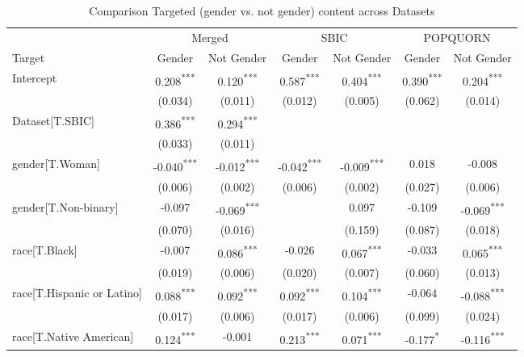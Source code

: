 \begin{table}[h!]
\caption{Comparison Targeted (gender vs. not gender) content across Datasets}
\label{}
\begin{center}
\begin{tabular}{lcccccc}
\hline

 & \multicolumn{2}{c}{Merged} & \multicolumn{2}{c}{SBIC} & \multicolumn{2}{c}{POPQUORN} \\
Target & Gender & Not Gender & Gender & Not Gender & Gender & Not Gender \\
\hline
Intercept & 0.208\textsuperscript{***} & 0.120\textsuperscript{***} & 0.587\textsuperscript{***} & 0.404\textsuperscript{***} & 0.390\textsuperscript{***} & 0.204\textsuperscript{***} \\
 & (0.034) & (0.011) & (0.012) & (0.005) & (0.062) & (0.014) \\
Dataset[T.SBIC] & \cellcolor{green!25}0.386\textsuperscript{***} & \cellcolor{green!25}0.294\textsuperscript{***} & & & & \\
 & (0.033) & (0.011) & & & & \\
gender[T.Woman] & \cellcolor{red!25}-0.040\textsuperscript{***} & \cellcolor{red!25}-0.012\textsuperscript{***} & \cellcolor{red!25}-0.042\textsuperscript{***} & \cellcolor{red!25}-0.009\textsuperscript{***} & 0.018 & -0.008 \\
 & (0.006) & (0.002) & (0.006) & (0.002) & (0.027) & (0.006) \\
gender[T.Non-binary] & -0.097 & \cellcolor{red!25}-0.069\textsuperscript{***} & & 0.097 & -0.109 & \cellcolor{red!25}-0.069\textsuperscript{***} \\
 & (0.070) & (0.016) & & (0.159) & (0.087) & (0.018) \\
race[T.Black] & -0.007 & \cellcolor{green!25}0.086\textsuperscript{***} & -0.026 & \cellcolor{green!25}0.067\textsuperscript{***} & -0.033 & \cellcolor{green!25}0.065\textsuperscript{***} \\
 & (0.019) & (0.006) & (0.020) & (0.007) & (0.060) & (0.013) \\
race[T.Hispanic or Latino] & \cellcolor{green!25}0.088\textsuperscript{***} & \cellcolor{green!25}0.092\textsuperscript{***} & \cellcolor{green!25}0.092\textsuperscript{***} & \cellcolor{green!25}0.104\textsuperscript{***} & -0.064 & \cellcolor{red!25}-0.088\textsuperscript{***} \\
 & (0.017) & (0.006) & (0.017) & (0.006) & (0.099) & (0.024) \\
race[T.Native American] & \cellcolor{green!25}0.124\textsuperscript{***} & -0.001 & \cellcolor{green!25}0.213\textsuperscript{***} & \cellcolor{green!25}0.071\textsuperscript{***} & \cellcolor{red!25}-0.177\textsuperscript{*} & \cellcolor{red!25}-0.116\textsuperscript{***} \\

\end{tabular}
\end{center}
\end{table}
